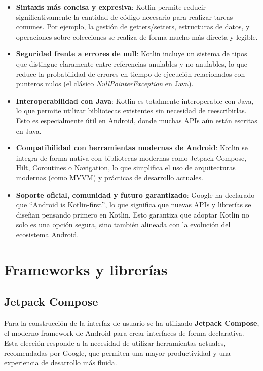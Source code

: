 \begin{itemize}
    \item \textbf{Sintaxis más concisa y expresiva}: Kotlin permite reducir significativamente la cantidad de código necesario para realizar tareas comunes. Por ejemplo, la gestión de getters/setters, estructuras de datos, y operaciones sobre colecciones se realiza de forma mucho más directa y legible.

    \item \textbf{Seguridad frente a errores de null}: Kotlin incluye un sistema de tipos que distingue claramente entre referencias anulables y no anulables, lo que reduce la probabilidad de errores en tiempo de ejecución relacionados con punteros nulos (el clásico \textit{NullPointerException} en Java).

    \item \textbf{Interoperabilidad con Java}: Kotlin es totalmente interoperable con Java, lo que permite utilizar bibliotecas existentes sin necesidad de reescribirlas. Esto es especialmente útil en Android, donde muchas APIs aún están escritas en Java.

    \item \textbf{Compatibilidad con herramientas modernas de Android}: Kotlin se integra de forma nativa con bibliotecas modernas como Jetpack Compose, Hilt, Coroutines o Navigation, lo que simplifica el uso de arquitecturas modernas (como MVVM) y prácticas de desarrollo actuales.

    \item \textbf{Soporte oficial, comunidad y futuro garantizado}: Google ha declarado que “Android is Kotlin-first”, lo que significa que nuevas APIs y librerías se diseñan pensando primero en Kotlin. Esto garantiza que adoptar Kotlin no solo es una opción segura, sino también alineada con la evolución del ecosistema Android.
\end{itemize}

\section{Frameworks y librerías}

\subsection{Jetpack Compose}

Para la construcción de la interfaz de usuario se ha utilizado \textbf{Jetpack Compose}, el moderno framework de Android para crear interfaces de forma declarativa. Esta elección responde a la necesidad de utilizar herramientas actuales, recomendadas por Google, que permiten una mayor productividad y una experiencia de desarrollo más fluida.

